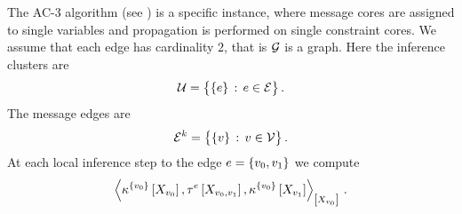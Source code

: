 \begin{example}
    The AC-3 algorithm (see \cite{mackworth_consistency_1977}) is a specific instance, where message cores are assigned to single variables and propagation is performed on single constraint cores.
    We assume that each edge has cardinality $2$, that is $\mathcal{G}$ is a graph.
    Here the inference clusters are
    \begin{align*}
        \mathcal{U}
        = \big\{\{e\} \,:\, e\in\mathcal{E}\big\} \, .
    \end{align*}
    The message edges are
    \begin{align*}
        \mathcal{E}^{k}
        = \big\{\{v\} \,:\, v\in\mathcal{V}\big\} \, .
    \end{align*}
    At each local inference step to the edge $e=\{v_{0},v_{1}\}$ we compute
    \begin{align*}
        \left\langle 
            \kappa^{\{v_{0}\}}\left[X_{v_{0}}\right],
            \tau^{e}\left[X_{v_{0},v_{1}}\right],
            \kappa^{\{v_{0}\}}\left[X_{v_{1}}\right]
        \right\rangle_{\left[ X_{v_{0}} \right]} \, .
    \end{align*}


\end{example}